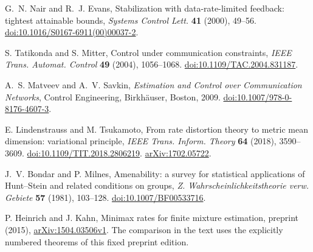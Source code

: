 G.~N. Nair and R.~J. Evans, Stabilization with data-rate-limited
feedback: tightest attainable bounds, \emph{Systems Control Lett.}
\textbf{41} (2000), 49--56.
\href{https://doi.org/10.1016/S0167-6911(00)00037-2}{doi:10.1016/S0167-6911(00)00037-2}.

S. Tatikonda and S. Mitter, Control under communication constraints,
\emph{IEEE Trans. Automat. Control} \textbf{49} (2004), 1056--1068.
\href{https://doi.org/10.1109/TAC.2004.831187}{doi:10.1109/TAC.2004.831187}.

A.~S. Matveev and A.~V. Savkin, \emph{Estimation and Control over
Communication Networks}, Control Engineering, Birkh\"auser, Boston, 2009.
\href{https://doi.org/10.1007/978-0-8176-4607-3}{doi:10.1007/978-0-8176-4607-3}.

E. Lindenstrauss and M. Tsukamoto, From rate distortion theory to
metric mean dimension: variational principle,
\emph{IEEE Trans. Inform. Theory} \textbf{64} (2018), 3590--3609.
\href{https://doi.org/10.1109/TIT.2018.2806219}{doi:10.1109/TIT.2018.2806219}.
\href{https://arxiv.org/abs/1702.05722}{arXiv:1702.05722}.

J.~V. Bondar and P. Milnes, Amenability: a survey for statistical
applications of Hunt--Stein and related conditions on groups,
\emph{Z. Wahrscheinlichkeitstheorie verw. Gebiete} \textbf{57}
(1981), 103--128.
\href{https://doi.org/10.1007/BF00533716}{doi:10.1007/BF00533716}.

P. Heinrich and J. Kahn, Minimax rates for finite mixture estimation,
preprint (2015), \href{https://arxiv.org/abs/1504.03506v1}{arXiv:1504.03506v1}.
The comparison in the text uses the explicitly numbered theorems
of this fixed preprint edition.

